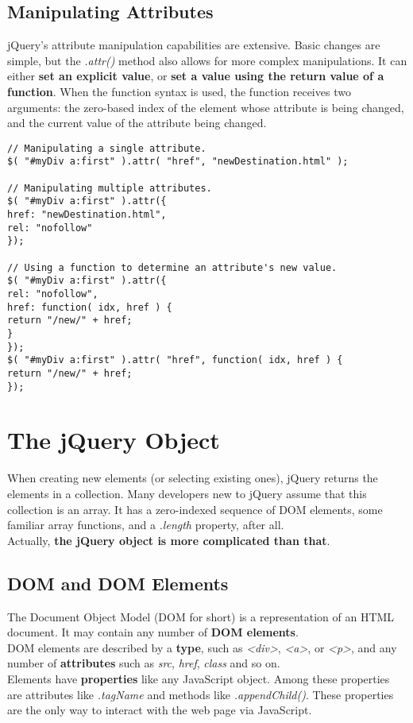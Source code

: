\documentclass[10pt,letterpaper]{report}
\begin{document}
\subsection{Manipulating Attributes}
jQuery's attribute manipulation capabilities are extensive. Basic changes are simple, but the \textit{.attr()} method also allows for more complex manipulations. It can either \textbf{set an explicit value}, or \textbf{set a value using the return value of a function}. When the function syntax is used, the function receives two arguments: the zero-based index of the element whose attribute is being changed, and the current value of the attribute being changed.
\begin{lstlisting}
// Manipulating a single attribute.
$( "#myDiv a:first" ).attr( "href", "newDestination.html" );

// Manipulating multiple attributes.
$( "#myDiv a:first" ).attr({
href: "newDestination.html",
rel: "nofollow"
});

// Using a function to determine an attribute's new value.
$( "#myDiv a:first" ).attr({
rel: "nofollow",
href: function( idx, href ) {
return "/new/" + href;
}
});
$( "#myDiv a:first" ).attr( "href", function( idx, href ) {
return "/new/" + href;
});
\end{lstlisting}
\section{The jQuery Object}
When creating new elements (or selecting existing ones), jQuery returns the elements in a collection. Many developers new to jQuery assume that this collection is an array. It has a zero-indexed sequence of DOM elements, some familiar array functions, and a \textit{.length} property, after all.\\
Actually, \textbf{the jQuery object is more complicated than that}.\\
\subsection{DOM and DOM Elements}
The Document Object Model (DOM for short) is a representation of an HTML document. It may contain any number of \textbf{DOM elements}.\\
DOM elements are described by a \textbf{type}, such as \textit{<div>}, \textit{<a>}, or \textit{<p>}, and any number of \textbf{attributes} such as \textit{src}, \textit{href}, \textit{class} and so on.\\
Elements have \textbf{properties} like any JavaScript object. Among these properties are attributes like \textit{.tagName} and methods like \textit{.appendChild()}. These properties are the only way to interact with the web page via JavaScript.\\
\end{document}
